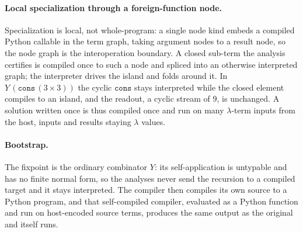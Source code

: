 \paragraph{Local specialization through a foreign-function node.}
Specialization is local, not whole-program: a single node kind embeds a compiled Python callable in
the term graph, taking argument nodes to a result node, so the node graph is the interoperation
boundary. A closed sub-term the analysis certifies is compiled once to such a node and spliced into an
otherwise interpreted graph; the interpreter drives the island and folds around it. In
$Y\,(\mathtt{cons}\,(3 \times 3))$ the cyclic $\mathtt{cons}$ stays interpreted while the closed
element compiles to an island, and the readout, a cyclic stream of $9$, is unchanged. A solution
written once is thus compiled once and run on many $\lambda$-term inputs from the host, inputs and
results staying $\lambda$ values.

\paragraph{Bootstrap.}
The fixpoint is the ordinary combinator $Y$: its self-application is untypable and has no finite
normal form, so the analyses never send the recursion to a compiled target and it stays
interpreted. The compiler then compiles
its own source to a Python program, and that self-compiled compiler, evaluated as a Python function
and run on host-encoded source terms, produces the same output as the original and itself runs.

